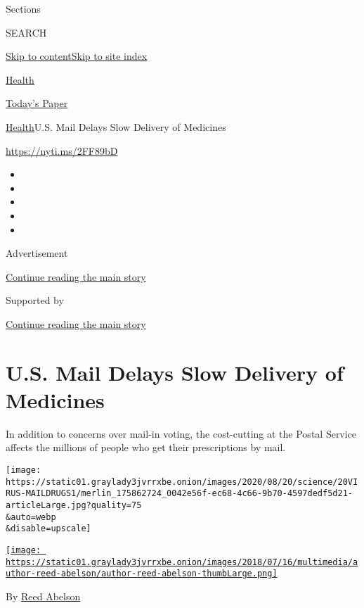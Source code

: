 Sections

SEARCH

\protect\hyperlink{site-content}{Skip to
content}\protect\hyperlink{site-index}{Skip to site index}

\href{https://www.nytimes3xbfgragh.onion/section/health}{Health}

\href{https://myaccount.nytimes3xbfgragh.onion/auth/login?response_type=cookie\&client_id=vi}{}

\href{https://www.nytimes3xbfgragh.onion/section/todayspaper}{Today's
Paper}

\href{/section/health}{Health}\textbar{}U.S. Mail Delays Slow Delivery
of Medicines

\url{https://nyti.ms/2FF89bD}

\begin{itemize}
\item
\item
\item
\item
\item
\end{itemize}

Advertisement

\protect\hyperlink{after-top}{Continue reading the main story}

Supported by

\protect\hyperlink{after-sponsor}{Continue reading the main story}

\hypertarget{us-mail-delays-slow-delivery-of-medicines}{%
\section{U.S. Mail Delays Slow Delivery of
Medicines}\label{us-mail-delays-slow-delivery-of-medicines}}

In addition to concerns over mail-in voting, the cost-cutting at the
Postal Service affects the millions of people who get their
prescriptions by mail.

\texttt{[image: https://static01.graylady3jvrrxbe.onion/images/2020/08/20/science/20VIRUS-MAILDRUGS1/merlin\_175862724\_0042e56f-ec68-4c66-9b70-4597dedf5d21-articleLarge.jpg?quality=75\\\&auto=webp\\\&disable=upscale]}

\href{https://www.nytimes3xbfgragh.onion/by/reed-abelson}{\texttt{[image: https://static01.graylady3jvrrxbe.onion/images/2018/07/16/multimedia/author-reed-abelson/author-reed-abelson-thumbLarge.png]}}

By \href{https://www.nytimes3xbfgragh.onion/by/reed-abelson}{Reed
Abelson}

